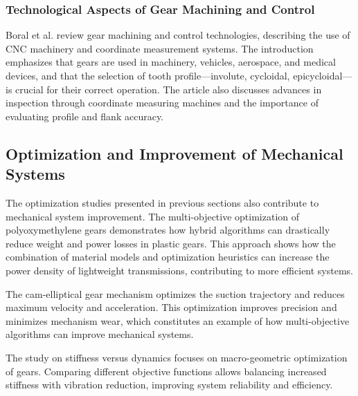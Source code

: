 \documentclass{article}
\begin{document}
\subsubsection*{Technological Aspects of Gear Machining and Control}
Boral et al. \cite{boral2023technological} review gear machining and control technologies, describing the use of CNC machinery and coordinate measurement systems.
The introduction emphasizes that gears are used in machinery, vehicles, aerospace, and medical devices, and that the selection of tooth profile—involute, cycloidal, epicycloidal—is crucial for their correct operation.
The article also discusses advances in inspection through coordinate measuring machines and the importance of evaluating profile and flank accuracy.

\subsection*{Optimization and Improvement of Mechanical Systems}

The optimization studies presented in previous sections also contribute to mechanical system improvement.
The multi-objective optimization of polyoxymethylene gears \cite{elsiedy2024multi} demonstrates how hybrid algorithms can drastically reduce weight and power losses in plastic gears.
This approach shows how the combination of material models and optimization heuristics can increase the power density of lightweight transmissions, contributing to more efficient systems.

The cam-elliptical gear mechanism \cite{zhang2024cam} optimizes the suction trajectory and reduces maximum velocity and acceleration.
This optimization improves precision and minimizes mechanism wear, which constitutes an example of how multi-objective algorithms can improve mechanical systems.

The study on stiffness versus dynamics \cite{marafona2024stiffness} focuses on macro-geometric optimization of gears.
Comparing different objective functions allows balancing increased stiffness with vibration reduction, improving system reliability and efficiency.

\newpage

\nocite{*}

\end{document}

